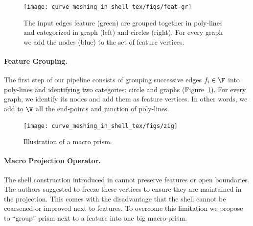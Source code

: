 \begin{figure}
    \centering
    \texttt{[image: curve\_meshing\_in\_shell\_tex/figs/feat-gr]}
    \caption{The input edges feature (green) are grouped together in poly-lines and categorized in graph (left) and circles (right). For every graph we add the nodes (blue) to the set of feature vertices.}
    \label{bichon:fig:feat-gr}
\end{figure}

\paragraph{Feature Grouping.}
The first step of our pipeline consists of grouping successive edges $f_i\in\F$ into poly-lines and identifying two categories: circle and graphs (Figure~\ref{bichon:fig:feat-gr}). For every graph, we identify its nodes and add them as feature vertices. In other words, we add to $\V$ all the end-points and junction of poly-lines.




\begin{figure}
    \centering
    \texttt{[image: curve\_meshing\_in\_shell\_tex/figs/zig]}
    \caption{Illustration of a macro prism.}
    \label{bichon:fig:zig}
\end{figure}

\paragraph{Macro Projection Operator.} 
The shell construction introduced in \cite{jiang2020bijective} cannot preserve features or open boundaries. The authors  suggested to freeze these vertices to ensure they are maintained in the projection. This comes with the disadvantage that the shell cannot be coarsened or improved next to features. To overcome this limitation we propose to ``group'' prism next to a feature into one big macro-prism.

